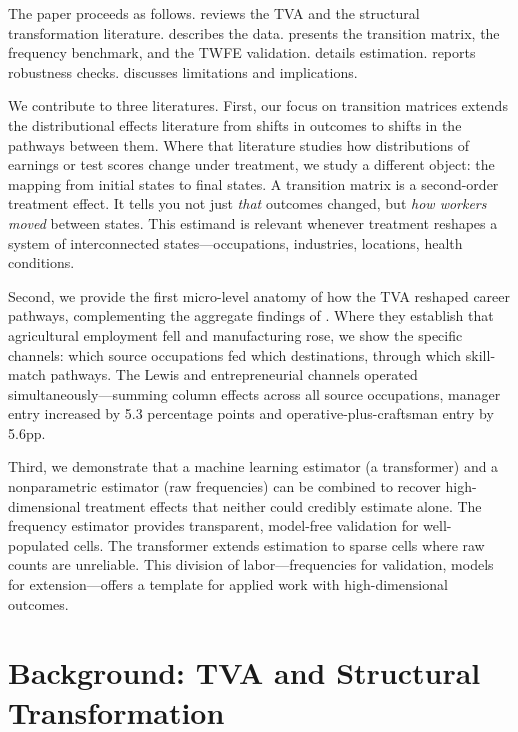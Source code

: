 \documentclass[12pt]{article}
\begin{document}
The paper proceeds as follows.  reviews the TVA and the structural transformation literature.  describes the data.  presents the transition matrix, the frequency benchmark, and the TWFE validation.  details estimation.  reports robustness checks.  discusses limitations and implications.

We contribute to three literatures. First, our focus on transition matrices extends the distributional effects literature \citep{athey2006, callaway2019, firpo2009} from shifts in outcomes to shifts in the pathways between them. Where that literature studies how distributions of earnings or test scores change under treatment, we study a different object: the mapping from initial states to final states. A transition matrix is a second-order treatment effect. It tells you not just \textit{that} outcomes changed, but \textit{how workers moved} between states. This estimand is relevant whenever treatment reshapes a system of interconnected states---occupations, industries, locations, health conditions.

Second, we provide the first micro-level anatomy of how the TVA reshaped career pathways, complementing the aggregate findings of \citet{kline2014}. Where they establish that agricultural employment fell and manufacturing rose, we show the specific channels: which source occupations fed which destinations, through which skill-match pathways. The Lewis and entrepreneurial channels operated simultaneously---summing column effects across all source occupations, manager entry increased by 5.3 percentage points and operative-plus-craftsman entry by 5.6pp.

Third, we demonstrate that a machine learning estimator (a transformer) and a nonparametric estimator (raw frequencies) can be combined to recover high-dimensional treatment effects that neither could credibly estimate alone. The frequency estimator provides transparent, model-free validation for well-populated cells. The transformer extends estimation to sparse cells where raw counts are unreliable. This division of labor---frequencies for validation, models for extension---offers a template for applied work with high-dimensional outcomes.


\section{Background: TVA and Structural Transformation}
\label{sec:background}
\end{document}

